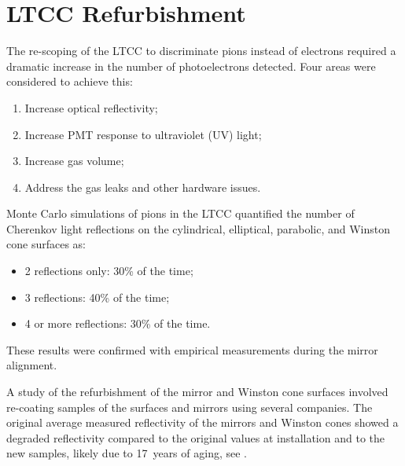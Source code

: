 \section{LTCC Refurbishment}

The re-scoping of the LTCC to discriminate pions instead of electrons required a dramatic increase in the
number of photoelectrons detected. Four areas were considered to achieve this:

\begin{enumerate}
	\item Increase optical reflectivity;
	\item Increase PMT response to ultraviolet (UV) light;
	\item Increase gas volume;
	\item Address the gas leaks and other hardware issues.
\end{enumerate}

Monte Carlo simulations of pions in the LTCC quantified the number of Cherenkov light  reflections on the cylindrical,
elliptical, parabolic, and Winston cone surfaces as:

\begin{itemize}
	\item 2 reflections only: 30\% of the time;
	\item 3 reflections: 40\% of the time;
	\item 4 or more reflections: 30\% of the time.
\end{itemize}

\noindent
These results were confirmed with empirical measurements during the mirror alignment.

A study of the refurbishment of the mirror and Winston cone surfaces involved re-coating samples of the
surfaces and mirrors using several companies. The original average measured reflectivity of the mirrors and
Winston cones showed a degraded reflectivity compared to the original values at installation and to the new
samples, likely due to 17~years of aging, see .

